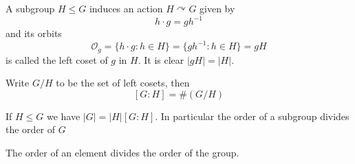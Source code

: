 \documentclass[12pt]{article}
\begin{document}
\begin{proposition}
    A subgroup $H \leq G$ induces an action $H \curvearrowright G$ given by
    \[ h \cdot g = gh^{-1} \]
    and its orbits
    \[ \mathcal O_g = \{ h \cdot g : h \in H \} = \{ gh^{-1} : h \in H \} = gH \]
    is called the left coset of $g$ in $H$.
    It is clear $|gH| = |H|$.
\end{proposition}
\begin{definition}
    Write $G/H$ to be the set of left cosets, then
    \[ [G: H] = \#(G/H) \]
\end{definition}
\begin{theorem}
    If $H \leq G$ we have $|G| = |H| [G:H]$. In particular the order of a subgroup
    divides the order of $G$
\end{theorem}
\begin{corollary}
    The order of an element divides the order of the group.
\end{corollary}
\end{document}
